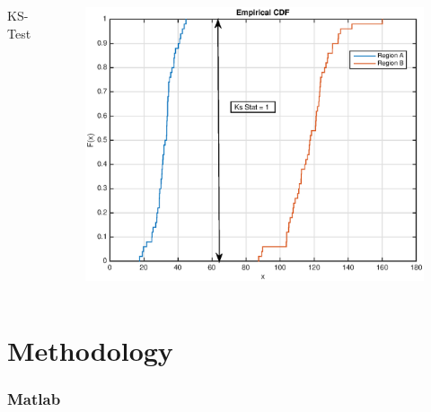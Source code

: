 \documentclass[9pt]{beamer}
\begin{document}
\begin{frame}
\begin{columns}
\begin{block}{KS-Test}
\end{block}
					\begin{figure}
							\includegraphics[scale=0.3]{cdf2.eps}
					\end{figure}
		\end{columns}
\end{frame}

\section{Methodology}
\begin{frame}
\frametitle{Matlab}
\end{frame}
\end{document}
